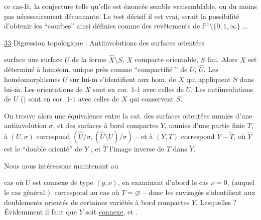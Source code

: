  ce cas-là, la conjecture telle qu'elle est énoncée  semble vraisemblable, ou du moins pas nécessairement déconnante. Le test décisif\unsure{,|,:} il est vrai, serait la possibilité d'obtenir les ``courbes'' ainsi définies comme des revêtements de $\mathbb{P}^1\setminus\{0,1,\infty\}$ \ldots


\uline{33} Digression topologique :
Antiinvolutions des surfaces orientées 


 surface  une surface $U$ de la forme $\widehat X\setminus S$, $X$  compacte orientable, $S$ fini. Alors $X$ est déterminé à homéom. unique près comme ``compactifié '' de $U$,  $\widehat U$.  Les homéomorphismes $U$ sur lui-$\overline{\mathrm m}$ s'identifient aux hom. de $X$ qui appliquent $S$ dans lui-$\overline{\mathrm m}$. Les orientations de $X$ sont en cor. $1$-$1$ avec celles de $U$. Les antiinvolutions de $U$ () sont en cor. $1$-$1$ avec celles de $X$ qui conservent $S$.

On trouve alors une équivalence entre la cat. des surfaces orientées   munies d'une antiinvolution $\sigma$, et des surfaces à bord compactes $Y$, munies d'une partie finie $T$, à $(U,\sigma)$ correspond $(\widehat U/\sigma,(\widehat U\setminus U)/\sigma)$ -- et à $(Y,T)$ correspond $\widetilde Y-\widetilde T$, où $\widetilde Y$ est le ``double orienté'' de $Y$ , et $\widetilde T$ l'image inverse de $T$ dans $\widetilde Y$.

Nous nous intéressons maintenant au


cas où $U$ est connexe de type $(g,\nu)$, en examinant d'abord le cas $\nu=0$,  (auquel le cas général ).   correspond au cas où $T=\varnothing$ -- donc les   envisagés  s'identifient aux doublements orientés de certaines variétés à bord compactes $Y$. Lesquelles ? Évidemment il faut que $Y$ soit \uline{connexe}, et .

